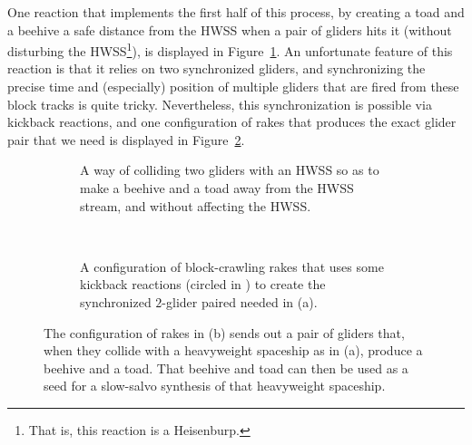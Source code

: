 One reaction that implements the first half of this process, by creating a toad and a beehive a safe distance from the HWSS when a pair of gliders hits it (without disturbing the HWSS\footnote{That is, this reaction is a Heisenburp.}), is displayed in Figure~\ref{fig:hwss_toad_beehive}. An unfortunate feature of this reaction is that it relies on two synchronized gliders, and synchronizing the precise time and (especially) position of multiple gliders that are fired from these block tracks is quite tricky. Nevertheless, this synchronization is possible via kickback reactions, and one configuration of rakes that produces the exact glider pair that we need is displayed in Figure~\ref{fig:31c_240_double_gun}.

\begin{figure}[!htb]
	\centering
	\begin{subfigure}[b]{0.28\textwidth}
		\centering
		\caption{A way of colliding two gliders with an HWSS so as to make a beehive and a toad away from the HWSS stream, and without affecting the HWSS.}\label{fig:hwss_toad_beehive}
	\end{subfigure} \ \	\ \ \begin{subfigure}[b]{0.69\textwidth}
		\centering
		\caption{A configuration of block-crawling rakes that uses some kickback reactions (circled in ) to create the synchronized $2$-glider paired needed in (a).}\label{fig:31c_240_double_gun}
	\end{subfigure}
	\caption{The configuration of rakes in (b) sends out a pair of gliders that, when they collide with a heavyweight spaceship as in (a), produce a beehive and a toad. That beehive and toad can then be used as a seed for a slow-salvo synthesis of that heavyweight spaceship.}\label{fig:31c_240_double_gun_at_hwss}
\end{figure}

